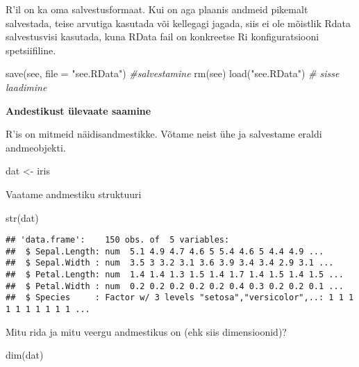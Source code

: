 \documentclass[
]{book}
\newenvironment{Shaded}{\begin{snugshade}}{\end{snugshade}}
\newcommand{\AttributeTok}[1]{\textcolor[rgb]{0.77,0.63,0.00}{#1}}
\newcommand{\CommentTok}[1]{\textcolor[rgb]{0.56,0.35,0.01}{\textit{#1}}}
\newcommand{\FunctionTok}[1]{\textcolor[rgb]{0.00,0.00,0.00}{#1}}
\newcommand{\NormalTok}[1]{#1}
\newcommand{\OtherTok}[1]{\textcolor[rgb]{0.56,0.35,0.01}{#1}}
\newcommand{\StringTok}[1]{\textcolor[rgb]{0.31,0.60,0.02}{#1}}
\begin{document}
R'il on ka oma salvestusformaat. Kui on aga plaanis andmeid pikemalt salvestada, teise arvutiga kasutada või kellegagi jagada, siis ei ole mõistlik Rdata salvestusvisi kasutada, kuna RData fail on konkreetse Ri konfiguratsiooni spetsiifiline.

\begin{Shaded}
\begin{Highlighting}[]
\FunctionTok{save}\NormalTok{(see, }\AttributeTok{file =} \StringTok{"see.RData"}\NormalTok{) }\CommentTok{\#salvestamine}
\FunctionTok{rm}\NormalTok{(see)}
\FunctionTok{load}\NormalTok{(}\StringTok{"see.RData"}\NormalTok{) }\CommentTok{\# sisse laadimine}
\end{Highlighting}
\end{Shaded}

\textbf{Andestikust ülevaate saamine}

R'is on mitmeid näidisandmestikke. Võtame neist ühe ja salvestame eraldi andmeobjekti.

\begin{Shaded}
\begin{Highlighting}[]
\NormalTok{dat }\OtherTok{\textless{}{-}}\NormalTok{ iris}
\end{Highlighting}
\end{Shaded}

Vaatame andmestiku struktuuri

\begin{Shaded}
\begin{Highlighting}[]
\FunctionTok{str}\NormalTok{(dat)}
\end{Highlighting}
\end{Shaded}

\begin{verbatim}
## 'data.frame':    150 obs. of  5 variables:
##  $ Sepal.Length: num  5.1 4.9 4.7 4.6 5 5.4 4.6 5 4.4 4.9 ...
##  $ Sepal.Width : num  3.5 3 3.2 3.1 3.6 3.9 3.4 3.4 2.9 3.1 ...
##  $ Petal.Length: num  1.4 1.4 1.3 1.5 1.4 1.7 1.4 1.5 1.4 1.5 ...
##  $ Petal.Width : num  0.2 0.2 0.2 0.2 0.2 0.4 0.3 0.2 0.2 0.1 ...
##  $ Species     : Factor w/ 3 levels "setosa","versicolor",..: 1 1 1 1 1 1 1 1 1 1 ...
\end{verbatim}

Mitu rida ja mitu veergu andmestikus on (ehk siis dimensioonid)?

\begin{Shaded}
\begin{Highlighting}[]
\FunctionTok{dim}\NormalTok{(dat)}
\end{Highlighting}
\end{Shaded}
\end{document}
